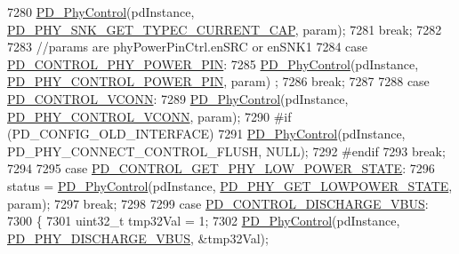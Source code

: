 \begin{DoxyCode}
7280             \hyperlink{usb__pd__policy_8c_a555b1880b5b259c3fdcd3da821e06cf2}{PD\_PhyControl}(pdInstance, 
      \hyperlink{group__usb__pd__phy__drv_ggab8bfca50e2ac042b47a697c88f84c3edae1406149d183dba960809596aa525528}{PD\_PHY\_SNK\_GET\_TYPEC\_CURRENT\_CAP}, param);
7281             \textcolor{keywordflow}{break};
7282 
7283         \textcolor{comment}{//params are phyPowerPinCtrl.enSRC or enSNK1}
7284         \textcolor{keywordflow}{case} \hyperlink{group__usb__pd__stack_gga0edd2a390d28d96646bc71aac1858af1a219d3fe217c5bf11a8126d09ee9fdb0c}{PD\_CONTROL\_PHY\_POWER\_PIN}:
7285             \hyperlink{usb__pd__policy_8c_a555b1880b5b259c3fdcd3da821e06cf2}{PD\_PhyControl}(pdInstance, \hyperlink{group__usb__pd__phy__drv_ggab8bfca50e2ac042b47a697c88f84c3edafb0f5a5d01b76353eae9108cb6bfc313}{PD\_PHY\_CONTROL\_POWER\_PIN}, param)
      ;
7286             \textcolor{keywordflow}{break};
7287 
7288         \textcolor{keywordflow}{case} \hyperlink{group__usb__pd__stack_gga0edd2a390d28d96646bc71aac1858af1a62e8479d23bf1208d5735aa76ff2aef6}{PD\_CONTROL\_VCONN}:
7289             \hyperlink{usb__pd__policy_8c_a555b1880b5b259c3fdcd3da821e06cf2}{PD\_PhyControl}(pdInstance, \hyperlink{group__usb__pd__phy__drv_ggab8bfca50e2ac042b47a697c88f84c3eda68ad1faa15b73743adf7f5a58013937b}{PD\_PHY\_CONTROL\_VCONN}, param);
7290 \textcolor{preprocessor}{#if (PD\_CONFIG\_OLD\_INTERFACE)
}
7291 \textcolor{preprocessor}{}            \hyperlink{usb__pd__policy_8c_a555b1880b5b259c3fdcd3da821e06cf2}{PD\_PhyControl}(pdInstance, PD\_PHY\_CONNECT\_CONTROL\_FLUSH, NULL);
7292 \textcolor{preprocessor}{#endif
}
7293 \textcolor{preprocessor}{}            \textcolor{keywordflow}{break};
7294 
7295         \textcolor{keywordflow}{case} \hyperlink{group__usb__pd__stack_gga0edd2a390d28d96646bc71aac1858af1aa58ce53ecaeed9f620eda031d4e5f342}{PD\_CONTROL\_GET\_PHY\_LOW\_POWER\_STATE}:
7296             status = \hyperlink{usb__pd__policy_8c_a555b1880b5b259c3fdcd3da821e06cf2}{PD\_PhyControl}(pdInstance, 
      \hyperlink{group__usb__pd__phy__drv_ggab8bfca50e2ac042b47a697c88f84c3edae2796c6a2d5cd486dd77cbc4c9b3eea7}{PD\_PHY\_GET\_LOWPOWER\_STATE}, param);
7297             \textcolor{keywordflow}{break};
7298 
7299         \textcolor{keywordflow}{case} \hyperlink{group__usb__pd__stack_gga0edd2a390d28d96646bc71aac1858af1ab4baaafc5cca20f365d103a948261b1f}{PD\_CONTROL\_DISCHARGE\_VBUS}:
7300         \{
7301             uint32\_t tmp32Val = 1;
7302             \hyperlink{usb__pd__policy_8c_a555b1880b5b259c3fdcd3da821e06cf2}{PD\_PhyControl}(pdInstance, \hyperlink{group__usb__pd__phy__drv_ggab8bfca50e2ac042b47a697c88f84c3edae705da68d4de3104b6852d84715bb71b}{PD\_PHY\_DISCHARGE\_VBUS}, &tmp32Val);

\end{DoxyCode}
